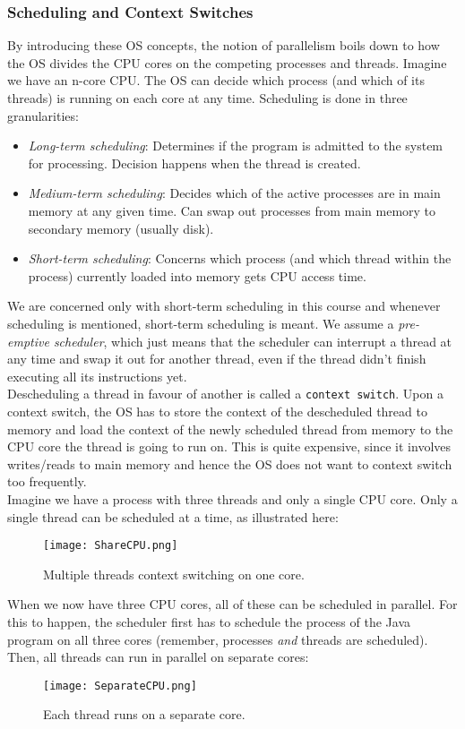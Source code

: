 \documentclass[main]{subfiles}
\begin{document}
\subsubsection{Scheduling and Context Switches}
By introducing these OS concepts, the notion of parallelism boils down to how the OS divides the CPU cores on the competing processes and threads. Imagine we have an n-core CPU. The OS can decide which process (and which of its threads) is running on each core at any time. Scheduling is done in three granularities:
\begin{itemize}
    \item \textit{Long-term scheduling}: Determines if the program is admitted to the system for processing. Decision happens when the thread is created.
    \item \textit{Medium-term scheduling}: Decides which of the active processes are in main memory at any given time. Can swap out processes from main memory to secondary memory (usually disk).
    \item \textit{Short-term scheduling}: Concerns which process (and which thread within the process) currently loaded into memory gets CPU access time.
\end{itemize}
We are concerned only with short-term scheduling in this course and whenever scheduling is mentioned, short-term scheduling is meant. We assume a \textit{pre-emptive scheduler}, which just means that the scheduler can interrupt a thread at any time and swap it out for another thread, even if the thread didn't finish executing all its instructions yet.\\[3mm]
Descheduling a thread in favour of another is called a \texttt{context switch}. Upon a context switch, the OS has to store the context of the descheduled thread to memory and load the context of the newly scheduled thread from memory to the CPU core the thread is going to run on. This is quite expensive, since it involves writes/reads to main memory and hence the OS does not want to context switch too frequently.\\[3mm]
Imagine we have a process with three threads and only a single CPU core. Only a single thread can be scheduled at a time, as illustrated here:
\begin{figure}[H]
    \centering
    \texttt{[image: ShareCPU.png]}
    \caption{Multiple threads context switching on one core.}
\end{figure}
When we now have three CPU cores, all of these can be scheduled in parallel. For this to happen, the scheduler first has to schedule the process of the Java program on all three cores (remember, processes \textit{and} threads are scheduled). Then, all threads can run in parallel on separate cores:
\begin{figure}[H]
    \centering
    \texttt{[image: SeparateCPU.png]}
    \caption{Each thread runs on a separate core.}
\end{figure}
\end{document}
